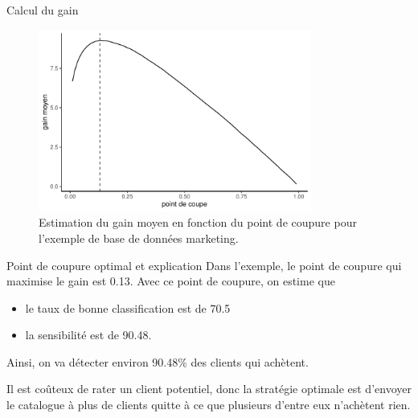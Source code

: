 \documentclass[
  ignorenonframetext,
]{beamer}
\providecommand{\tightlist}{%
  \setlength{\itemsep}{0pt}\setlength{\parskip}{0pt}}\usepackage{longtable,booktabs,array}
\begin{document}
\begin{frame}{Calcul du gain}
\protect\hypertarget{calcul-du-gain}{}
\begin{figure}

{\centering \includegraphics[width=0.8\textwidth,height=\textheight]{MATH60602-diapos6_files/figure-beamer/fig-coupure-pondere-1.pdf}

}

\caption{\label{fig-coupure-pondere}Estimation du gain moyen en fonction
du point de coupure pour l'exemple de base de données marketing.}

\end{figure}
\end{frame}

\begin{frame}{Point de coupure optimal et explication}
\protect\hypertarget{point-de-coupure-optimal-et-explication}{}
Dans l'exemple, le point de coupure qui maximise le gain est 0.13. Avec
ce point de coupure, on estime que

\begin{itemize}
\tightlist
\item
  le taux de bonne classification est de 70.5
\item
  la sensibilité est de 90.48.
\end{itemize}

Ainsi, on va détecter environ 90.48\% des clients qui achètent.

Il est coûteux de rater un client potentiel, donc la stratégie optimale
est d'envoyer le catalogue à plus de clients quitte à ce que plusieurs
d'entre eux n'achètent rien.
\end{frame}
\end{document}

